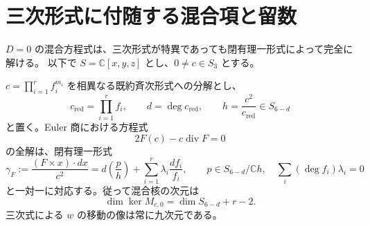 \section{三次形式に付随する混合項と留数}
\label{sec:cubic-residues-v32}

$D=0$ の混合方程式は、三次形式が特異であっても閉有理一形式によって完全に解ける。
以下で $S=\mathbb C[x,y,z]$ とし、$0\ne c\in S_3$ とする。

\begin{theorem}[全ての非零三次形式に対する混合核]
\label{thm:cubic-residues-v32}
$c=\prod_{i=1}^r f_i^{m_i}$ を相異なる既約斉次形式への分解とし、
\[
 c_{\mathrm{red}}=\prod_{i=1}^r f_i,\qquad
 d=\deg c_{\mathrm{red}},\qquad h=\frac{c^2}{c_{\mathrm{red}}}\in S_{6-d}
\]
と置く。Euler 商における方程式
\[
 2F(c)-c\operatorname{div}F=0
\]
の全解は、閉有理一形式
\begin{equation}
 \gamma_F:=\frac{(F\times x)\cdot dx}{c^2}
 =d\!\left(\frac{p}{h}\right)+\sum_{i=1}^r\lambda_i\frac{df_i}{f_i},
 \qquad
 p\in S_{6-d}/\mathbb Ch,\quad
 \sum_i(\deg f_i)\lambda_i=0
 \label{eq:cubic-residue-normal-v32}
\end{equation}
と一対一に対応する。従って混合核の次元は
\[
 \dim\ker M_{c,0}=\dim S_{6-d}+r-2.
\]
三次式による $w$ の移動の像は常に九次元である。
\end{theorem}

